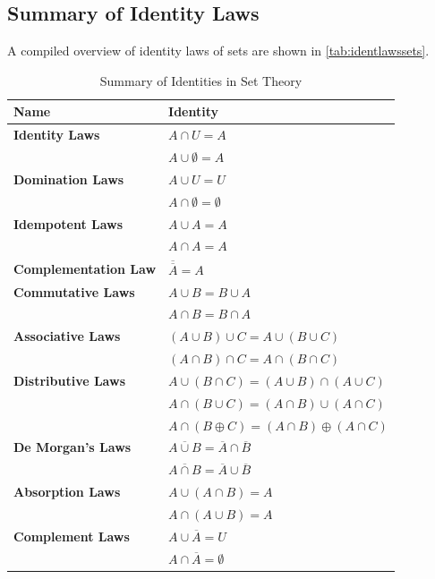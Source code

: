 \subsection{Summary of Identity Laws}
A compiled overview of identity laws of sets are shown in \autoref{tab:identlawssets}.
\begin{table}[H]
\centering
\scriptsize
\def\arraystretch{1.4}
\begin{tabular}{p{}p{}}
\toprule
Name  & Identity \\ \midrule
\textbf{Identity Laws} & \(A \cap U = A\) \\
\textbf{} & \(A \cup \emptyset = A\) \\\midrule
\textbf{Domination Laws} & \(A \cup U = U\) \\
\textbf{} &  \(A \cap \emptyset = \emptyset \) \\\midrule
\textbf{Idempotent Laws} & \(A \cup A = A\) \\
\textbf{} &  \(A \cap A = A\) \\\midrule
\textbf{Complementation Law} & \(\overline{\overline{A}} = A \) \\\midrule
\textbf{Commutative Laws} & \( A \cup B = B \cup A \) \\
\textbf{} & \(A \cap B = B \cap A \) \\\midrule
\textbf{Associative Laws} & \((A \cup B) \cup C = A \cup (B \cup C)\) \\
\textbf{} & \((A \cap B) \cap C = A \cap (B \cap C) \) \\\midrule
\textbf{Distributive Laws} & \(A \cup (B \cap C) = (A \cup B) \cap (A \cup C) \) \\
\textbf{} & \(A \cap (B \cup C) = (A \cap B) \cup (A \cap C) \) \\
\textbf{} & \(A \cap (B \oplus C) = (A \cap B) \oplus (A \cap C)\) \\\midrule
\textbf{De Morgan's Laws} & \(\overline{A \cup B} = \overline{A} \cap \overline{B}
 \) \\
\textbf{} & \(\overline{A \cap B} = \overline{A} \cup \overline{B}\) \\\midrule
\textbf{Absorption Laws} & \(A \cup (A \cap B) = A \) \\
\textbf{} & \(A \cap (A \cup B) = A \) \\\midrule
\textbf{Complement Laws} & \(A \cup \overline{A} = U \) \\
\textbf{} & \(A \cap \overline{A} = \emptyset \) \\ \bottomrule
\end{tabular}
\caption{Summary of Identities in Set Theory}\label{tab:identlawssets}
\end{table}

